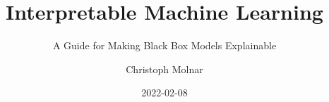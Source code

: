 \documentclass[
  11pt,
]{scrbook}
\title{Interpretable Machine Learning}
\subtitle{A Guide for Making Black Box Models Explainable}
\author{Christoph Molnar}
\date{2022-02-08}
\begin{document}
\maketitle

\thispagestyle{empty}

\end{document}
